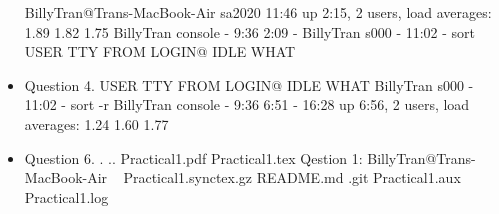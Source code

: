 \documentclass[paper=a4, fontsize=11pt]{scrartcl}
\numberwithin{equation}{section}		%
\numberwithin{figure}{section}			%
\numberwithin{table}{section}				%
\begin{document}
\begin{itemize}
	BillyTran@Trans-MacBook-Air sa2020 %
	11:46  up  2:15, 2 users, load averages: 1.89 1.82 1.75
	BillyTran console  -                 9:36    2:09 -
	BillyTran s000     -                11:02       - sort
	USER     TTY      FROM              LOGIN@  IDLE WHAT
	
	\item Question 4.
	USER     TTY      FROM              LOGIN@  IDLE WHAT
	BillyTran s000     -                11:02       - sort -r
	BillyTran console  -                 9:36    6:51 -
	16:28  up  6:56, 2 users, load averages: 1.24 1.60 1.77
	
	\item Question 6.
	.
	..
	Practical1.pdf
	Practical1.tex
	Qestion 1: BillyTran@Trans-MacBook-Air ~ %
	Practical1.synctex.gz
	README.md
	.git
	Practical1.aux
	Practical1.log
	
\end{itemize}

\end{document}
